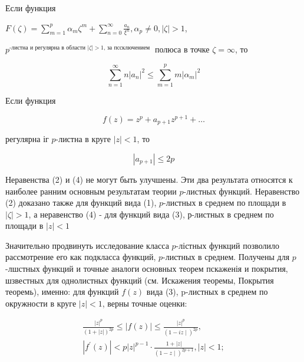 \documentclass[10pt]{article}
\begin{document}
Если функция



$F(\zeta)=\sum_{m=1}^{p} \alpha_{m} \zeta^{m}+\sum_{n=0}^{\infty} \frac{a_{n}}{\xi^{n}}, \alpha_{p} \neq 0,|\zeta|>1$,



$p^{\text {-листна и регулярна в области }|\zeta|>1 \text {, за пссключением }}$ полюса в точке $\zeta=\infty$, то



\[

\sum_{n=1}^{\infty} n\left|a_{n}\right|^{2} \leqslant \sum_{m=1}^{p} m\left|\alpha_{m}\right|^{2}

\]



Если функция



\[

f(z)=z^{p}+a_{p+1} z^{p+1}+\ldots

\]



регулярна іг $p$-листна в круге $|z|<1$, то



\[

\left|a_{p+1}\right| \leqslant 2 p

\]



Неравенства (2) и (4) не могут быть улучшены. Эти два результата относятся к наиболее ранним основным результатам теории $p$-листных функций. Неравенство (2) доказано также для функций вида (1), $p$-листных в среднем по площади в $|\zeta|>1$, а неравенство (4) - для функций вида (3), р-листных в среднем по площади в $|z|<1$



Значительно продвинуть исследование класса $p$-лістных функций позволило рассмотрение его как подкласса функций, $p$-листных в среднем. Получены для $p$-лшстных функций и точные аналоги основных теорем пскаженія и покрытия, шзвестных для однолистных функций (см. Искажения теоремы, Покрытия теоремь), именно: для функций $f(z)$ вида (3), p-листных в среднем по окружности в круге $|z|<1$, верны точные оценки:



\[

\begin{gathered}

\frac{|z|^{p}}{(1+|z|)^{2 p}} \leqslant|f(z)| \leqslant \frac{|z|^{p}}{(1-i z \mid)^{2 p}}, \\

\left|f^{\prime}(z)\right|<p|z|^{p-1} \cdot \frac{1+|z|}{(1-z \mid)^{2 p+1}},|z|<1 ;

\end{gathered}

\]
\end{document}
